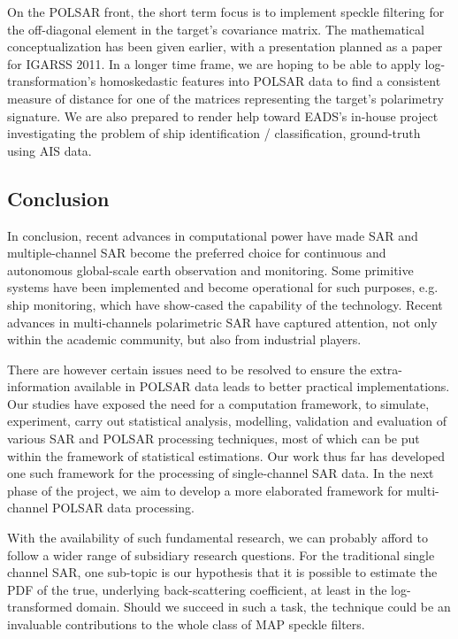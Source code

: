 On the POLSAR front, the short term focus is to implement speckle filtering for the off-diagonal element in the target's covariance matrix.
The mathematical conceptualization has been given earlier, with a presentation planned as a paper for IGARSS 2011.
In a longer time frame, we are hoping to be able to apply log-transformation's homoskedastic features into POLSAR data to find a consistent measure of distance for one of the matrices representing the target's polarimetry signature.
We are also prepared to render help toward EADS's in-house project investigating the problem of ship identification / classification, ground-truth using AIS data. 

\subsection{Conclusion}

In conclusion, recent advances in computational power have made SAR and multiple-channel SAR become the preferred choice for continuous and autonomous global-scale earth observation and monitoring.
Some primitive systems have been implemented and become operational for such purposes, e.g. ship monitoring, which have show-cased the capability of the technology.
Recent advances in multi-channels polarimetric SAR have captured attention, not only within the academic community, but also from industrial players.

There are however certain issues need to be resolved to ensure the extra-information available in POLSAR data leads to better practical implementations.
Our studies have exposed the need for a computation framework, to simulate, experiment, carry out statistical analysis, modelling, validation and evaluation of various SAR and POLSAR processing techniques, most of which can be put within the framework of statistical estimations.
Our work thus far has developed one such framework for the processing of single-channel SAR data.
In the next phase of the project, we aim to develop a more elaborated framework for multi-channel POLSAR data processing.

With the availability of such fundamental research, we can probably afford to follow a wider range of subsidiary research questions.
For the traditional single channel SAR, one sub-topic is our hypothesis that it is possible to estimate the PDF of the true, underlying back-scattering coefficient, at least in the log-transformed domain. 
Should we succeed in such a task, the technique could be an invaluable contributions to the whole class of MAP speckle filters.

